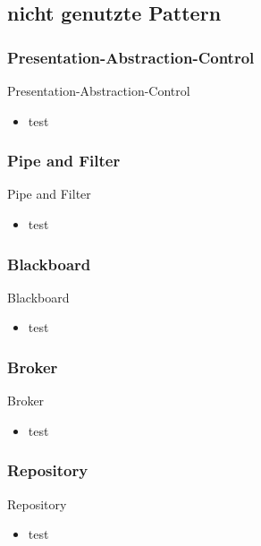 \documentclass{beamer}
\begin{document}
		
		\subsection{nicht genutzte Pattern}
		\subsubsection[PAC]{Presentation-Abstraction-Control}
		\begin{frame}{Presentation-Abstraction-Control}
			\begin{itemize}
				\item test
			\end{itemize}
		\end{frame}
		
		\subsubsection{Pipe and Filter}
		\begin{frame}{Pipe and Filter}
			\begin{itemize}
				\item test
					
			\end{itemize}
		\end{frame}
				
		\subsubsection{Blackboard}
		\begin{frame}{Blackboard}
			\begin{itemize}
				\item test
				
			\end{itemize}
		\end{frame}
		
		\subsubsection{Broker}
		\begin{frame}{Broker}
			\begin{itemize}
				\item test
				
			\end{itemize}
		\end{frame}
		
		\subsubsection{Repository}
		\begin{frame}{Repository}
			\begin{itemize}
				\item test
				
			\end{itemize}
		\end{frame}
		
\end{document}
